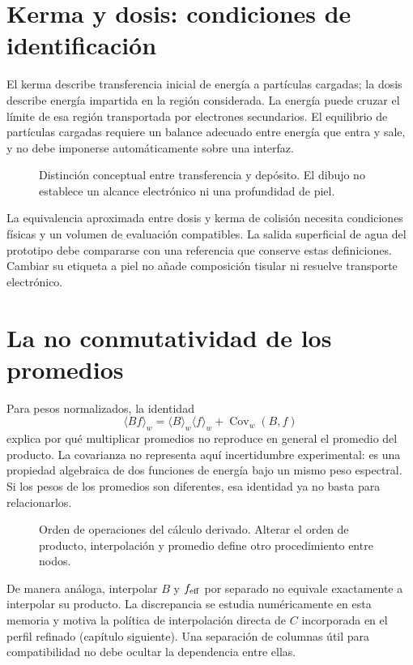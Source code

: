 \section{Kerma y dosis: condiciones de identificación}
El kerma describe transferencia inicial de energía a partículas cargadas; la dosis describe energía impartida en la región considerada. La energía puede cruzar el límite de esa región transportada por electrones secundarios. El equilibrio de partículas cargadas requiere un balance adecuado entre energía que entra y sale, y no debe imponerse automáticamente sobre una interfaz.
\begin{figure}[H]\centering

\caption{Distinción conceptual entre transferencia y depósito. El dibujo no establece un alcance electrónico ni una profundidad de piel.}
\end{figure}
La equivalencia aproximada entre dosis y kerma de colisión necesita condiciones físicas y un volumen de evaluación compatibles. La salida superficial de agua del prototipo debe compararse con una referencia que conserve estas definiciones. Cambiar su etiqueta a piel no añade composición tisular ni resuelve transporte electrónico.

\section{La no conmutatividad de los promedios}
Para pesos normalizados, la identidad
\begin{equation}
\langle Bf\rangle_w=\langle B\rangle_w\langle f\rangle_w+
\operatorname{Cov}_w(B,f)
\end{equation}
explica por qué multiplicar promedios no reproduce en general el promedio del producto. La covarianza no representa aquí incertidumbre experimental: es una propiedad algebraica de dos funciones de energía bajo un mismo peso espectral. Si los pesos de los promedios son diferentes, esa identidad ya no basta para relacionarlos.
\begin{figure}[H]\centering

\caption{Orden de operaciones del cálculo derivado. Alterar el orden de producto, interpolación y promedio define otro procedimiento entre nodos.}
\end{figure}
De manera análoga, interpolar $B$ y $f_{\rm eff}$ por separado no equivale exactamente a interpolar su producto. La discrepancia se estudia numéricamente en esta memoria y motiva la política de interpolación directa de $C$ incorporada en el perfil refinado (capítulo siguiente). Una separación de columnas útil para compatibilidad no debe ocultar la dependencia entre ellas.

